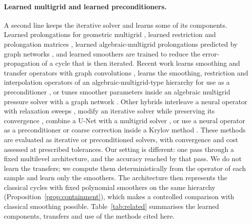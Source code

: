 \paragraph{Learned multigrid and learned preconditioners.} A second line keeps the iterative solver and learns some of its
components. Learned prolongations for geometric multigrid \cite{greenfeld2019}, learned restriction and prolongation
matrices \cite{katrutsa2017}, learned algebraic-multigrid prolongations predicted by graph networks \cite{luz2020}, and
learned smoothers \cite{huang2023,fanaskov2021} are trained to reduce the error-propagation of a cycle that is then
iterated. Recent work learns smoothing and transfer operators with graph convolutions \cite{wangluo2026}, learns the
smoothing, restriction and interpolation operators of an algebraic-multigrid-type hierarchy for use as a preconditioner
\cite{zhanglisaad2026}, or tunes smoother parameters inside an algebraic multigrid pressure solver with a graph network
\cite{chillon2026}. Other hybrids interleave a neural operator with relaxation sweeps \cite{zhang2024hints}, modify an
iterative solver while preserving its convergence \cite{hsieh2019}, combine a U-Net with a multigrid solver
\cite{han2024ugrid}, or use a neural operator as a preconditioner or coarse correction inside a Krylov method
\cite{rudikov2024,kopanicakova2025,melchers2026,liu2025nodal}. These methods are evaluated as iterative or preconditioned solvers, with convergence and cost assessed at prescribed
tolerances. Our setting is different: one pass through a fixed multilevel architecture, and the accuracy reached by that
pass. We do not learn the transfers; we compute them deterministically from the operator of each sample and learn only the
smoothers. The architecture then represents the classical cycles with fixed polynomial smoothers on the same hierarchy
(Proposition~\ref{prop:containment}), which makes a controlled comparison with classical smoothing possible. Table~\ref{tab:related}
summarises the learned components, transfers and use of the methods cited here.


